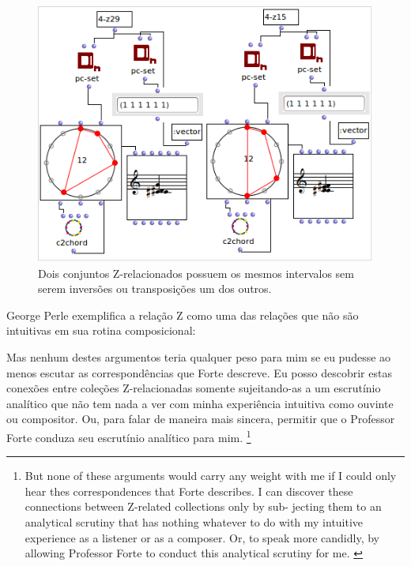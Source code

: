 \documentclass[
	12pt,				%
	openright,			%
	twoside,			%
	a4paper,			%
	english,			%
	french,				%
	spanish,			%
	brazil				%
	]{abntex2}
\begin{document}
\begin{figure}[!h]
	\caption{\label{fig_grafico}Dois conjuntos Z-relacionados possuem os mesmos intervalos sem serem inversões ou transposições um dos outros. }
	\begin{center}
	    \includegraphics[scale=0.7]{OM_settheory/Z_related.png}
	\end{center}
\end{figure}






George Perle exemplifica a relação Z como uma das relações que não são intuitivas em sua rotina composicional:
\pagebreak

\begin{citacao}
Mas nenhum destes argumentos teria qualquer peso para mim se eu pudesse ao menos escutar as correspondências que Forte descreve. Eu posso descobrir estas conexões entre coleções Z-relacionadas somente sujeitando-as a um escrutínio analítico que não tem nada a ver com minha experiência intuitiva como ouvinte ou compositor. Ou, para falar de maneira mais sincera, permitir que o Professor Forte conduza seu escrutínio analítico para mim.
\cite[p.168]{perle1990pitch}\footnote{
But none of these arguments would carry any weight with me if
I could only hear thes correspondences that Forte describes. I can
discover these connections between Z-related collections only by sub-
jecting them to an analytical scrutiny that has nothing whatever to do
with my intuitive experience as a listener or as a composer. Or, to
speak more candidly, by allowing Professor Forte to conduct this
analytical scrutiny for me. 
\cite[p.168]{perle1990pitch}}
\end{citacao}
\end{document}
